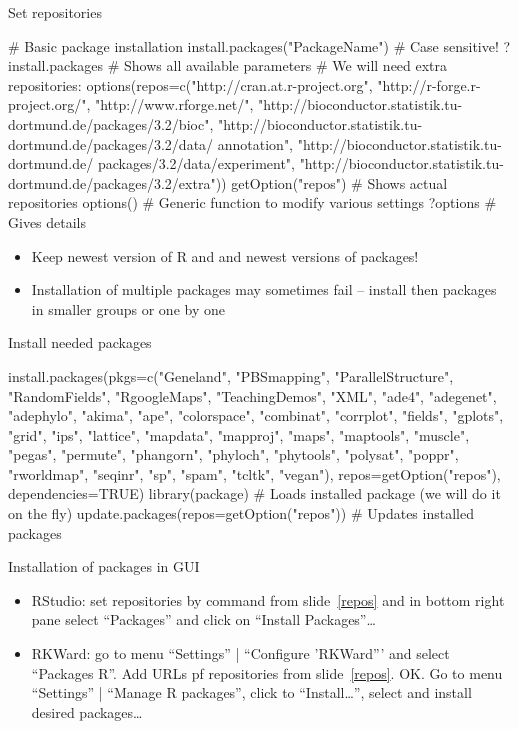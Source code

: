 \documentclass[compress, ucs, xelatex, 11pt, xcolor=svgnames,
  hyperref={
    bookmarks=true,
    unicode=true,
    colorlinks=true,
    pdftitle={Molecular data in R},
    plainpages=false,
    pdfauthor={Vojtech Zeisek},
    pdfsubject={Course about phylogeny and evolution in R},
    pdfcreator={XeLaTeX},
    pdfkeywords={R, evolution, phylogeny, molecular data},
    linkcolor=Tomato,
    anchorcolor=SaddleBrown,
    citecolor=Goldenrod,
    filecolor=DarkMagenta,
    menucolor=Sienna,
    urlcolor=DarkTurquoise,
    pdftex},
  url={hyphens, lowtilde} %
  ]{beamer}
\begin{document}
\begin{frame}[fragile, label=repos]{Set repositories}
  \begin{spluscode}
    # Basic package installation
    install.packages("PackageName") # Case sensitive!
    ?install.packages # Shows all available parameters
    # We will need extra repositories:
    options(repos=c("http://cran.at.r-project.org",
      "http://r-forge.r-project.org/", "http://www.rforge.net/",
      "http://bioconductor.statistik.tu-dortmund.de/packages/3.2/bioc",
      "http://bioconductor.statistik.tu-dortmund.de/packages/3.2/data/
      annotation", "http://bioconductor.statistik.tu-dortmund.de/
      packages/3.2/data/experiment",
      "http://bioconductor.statistik.tu-dortmund.de/packages/3.2/extra"))
    getOption("repos") # Shows actual repositories
    options() # Generic function to modify various settings
    ?options # Gives details
  \end{spluscode}
\begin{itemize}
 \item \alert{Keep newest version of R and and newest versions of packages!}
 \item Installation of multiple packages may sometimes fail -- install then packages in smaller groups or one by one
\end{itemize}
\end{frame}

\begin{frame}[fragile]{Install needed packages}
  \begin{spluscode}
    install.packages(pkgs=c("Geneland", "PBSmapping", "ParallelStructure",
      "RandomFields", "RgoogleMaps", "TeachingDemos", "XML", "ade4",
      "adegenet", "adephylo", "akima", "ape", "colorspace", "combinat",
      "corrplot", "fields", "gplots", "grid", "ips", "lattice", "mapdata",
      "mapproj", "maps", "maptools", "muscle", "pegas", "permute",
      "phangorn", "phyloch", "phytools", "polysat", "poppr", "rworldmap",
      "seqinr", "sp", "spam", "tcltk", "vegan"), repos=getOption("repos"),
      dependencies=TRUE)
    library(package) # Loads installed package (we will do it on the fly)
    update.packages(repos=getOption("repos")) # Updates installed packages
  \end{spluscode}
\begin{block}{Installation of packages in GUI}
  \begin{footnotesize}
    \begin{itemize}
      \item RStudio: set repositories by command from slide~\ref{repos} and in bottom right pane select ``Packages'' and click on ``Install Packages''\ldots
      \item RKWard: go to menu ``Settings'' | ``Configure 'RKWard''' and select ``Packages R''. Add URLs pf repositories from slide~\ref{repos}. OK. Go to menu ``Settings'' | ``Manage R packages'', click to ``Install\ldots'', select and install desired packages\ldots
    \end{itemize}
  \end{footnotesize}
\end{block}
\end{frame}
\end{document}
